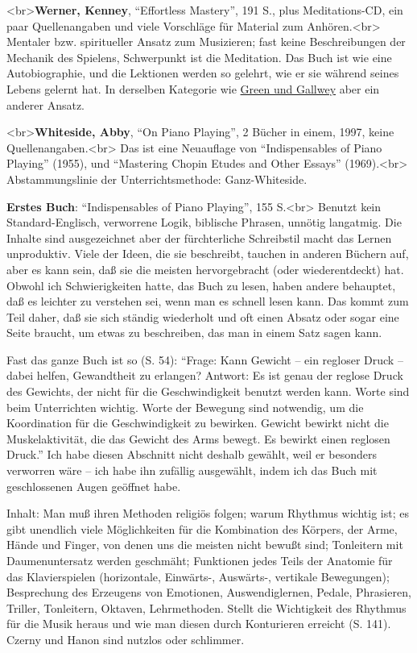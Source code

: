 \label{Werner}

<br>\textbf{Werner, Kenney}, \enquote{Effortless Mastery}, 191 S., plus Meditations-CD, ein paar Quellenangaben und viele Vorschläge für Material zum Anhören.<br>
Mentaler bzw. spiritueller Ansatz zum Musizieren; fast keine Beschreibungen der Mechanik des Spielens, Schwerpunkt ist die Meditation.
Das Buch ist wie eine Autobiographie, und die Lektionen werden so gelehrt, wie er sie während seines Lebens gelernt hat.
In derselben Kategorie wie \hyperref[Green]{Green und Gallwey} aber ein anderer Ansatz.


\label{Whiteside}

<br>\textbf{Whiteside, Abby}, \enquote{On Piano Playing}, 2 Bücher in einem, 1997, keine Quellenangaben.<br>
Das ist eine Neuauflage von \enquote{Indispensables of Piano Playing} (1955), und \enquote{Mastering Chopin Etudes and Other Essays} (1969).<br>
Abstammungslinie der Unterrichtsmethode: Ganz-Whiteside.

\textbf{Erstes Buch}: \enquote{Indispensables of Piano Playing}, 155 S.<br>
Benutzt kein Standard-Englisch, verworrene Logik, biblische Phrasen, unnötig langatmig.
Die Inhalte sind ausgezeichnet aber der fürchterliche Schreibstil macht das Lernen unproduktiv.
Viele der Ideen, die sie beschreibt, tauchen in anderen Büchern auf, aber es kann sein, daß sie die meisten hervorgebracht (oder wiederentdeckt) hat.
Obwohl ich Schwierigkeiten hatte, das Buch zu lesen, haben andere behauptet, daß es leichter zu verstehen sei, wenn man es schnell lesen kann.
Das kommt zum Teil daher, daß sie sich ständig wiederholt und oft einen Absatz oder sogar eine Seite braucht, um etwas zu beschreiben, das man in einem Satz sagen kann.

Fast das ganze Buch ist so (S. 54): \enquote{Frage: Kann Gewicht -- ein regloser Druck -- dabei helfen, Gewandtheit zu erlangen?
Antwort: Es ist genau der reglose Druck des Gewichts, der nicht für die Geschwindigkeit benutzt werden kann.
Worte sind beim Unterrichten wichtig.
Worte der Bewegung sind notwendig, um die Koordination für die Geschwindigkeit zu bewirken.
Gewicht bewirkt nicht die Muskelaktivität, die das Gewicht des Arms bewegt.
Es bewirkt einen reglosen Druck.}
Ich habe diesen Abschnitt nicht deshalb gewählt, weil er besonders verworren wäre -- ich habe ihn zufällig ausgewählt, indem ich das Buch mit geschlossenen Augen geöffnet habe.

Inhalt: Man muß ihren Methoden religiös folgen; warum Rhythmus wichtig ist; es gibt unendlich viele Möglichkeiten für die Kombination des Körpers, der Arme, Hände und Finger, von denen uns die meisten nicht bewußt sind; Tonleitern mit Daumenuntersatz werden geschmäht; Funktionen jedes Teils der Anatomie für das Klavierspielen (horizontale, Einwärts-, Auswärts-, vertikale Bewegungen); Besprechung des Erzeugens von Emotionen, Auswendiglernen, Pedale, Phrasieren, Triller, Tonleitern, Oktaven, Lehrmethoden.
Stellt die Wichtigkeit des Rhythmus für die Musik heraus und wie man diesen durch Konturieren erreicht (S. 141).
Czerny und Hanon sind nutzlos oder schlimmer.

